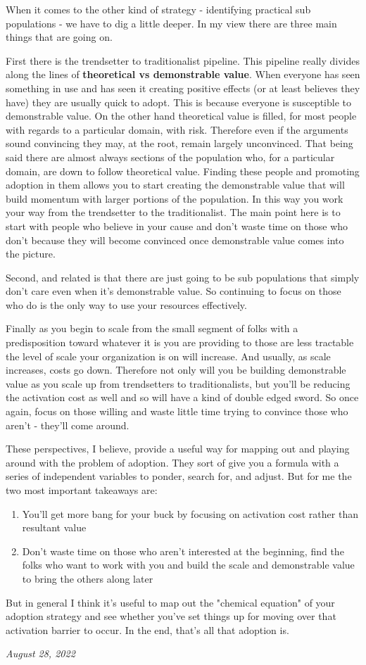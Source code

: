 \documentclass[10pt,a5paper]{book}
\begin{document}
When it comes to the other kind of strategy - identifying practical sub populations - we have to dig a little deeper. In my view there are three main things that are going on. 

First there is the trendsetter to traditionalist pipeline. This pipeline really divides along the lines of \textbf{theoretical vs demonstrable value}. When everyone has seen something in use and has seen it creating positive effects (or at least believes they have) they are usually quick to adopt. This is because everyone is susceptible to demonstrable value. On the other hand theoretical value is filled, for most people with regards to a particular domain, with risk. Therefore even if the arguments sound convincing they may, at the root, remain largely unconvinced. That being said there are almost always sections of the population who, for a particular domain, are down to follow theoretical value. Finding these people and promoting adoption in them allows you to start creating the demonstrable value that will build momentum with larger portions of the population. In this way you work your way from the trendsetter to the traditionalist. The main point here is to start with people who believe in your cause and don't waste time on those who don't because they will become convinced once demonstrable value comes into the picture. 

Second, and related is that there are just going to be sub populations that simply don't care even when it's demonstrable value. So continuing to focus on those who do is the only way to use your resources effectively.

Finally as you begin to scale from the small segment of folks with a predisposition toward whatever it is you are providing to those are less tractable the level of scale your organization is on will increase. And usually, as scale increases, costs go down. Therefore not only will you be building demonstrable value as you scale up from trendsetters to traditionalists, but you'll be reducing the activation cost as well and so will have a kind of double edged sword. So once again, focus on those willing and waste little time trying to convince those who aren't - they'll come around. 

These perspectives, I believe, provide a useful way for mapping out and playing around with the problem of adoption. They sort of give you a formula with a series of independent variables to ponder, search for, and adjust. But for me the two most important takeaways are:
\begin{enumerate}
\item You'll get more bang for your buck by focusing on activation cost rather than resultant value
\item Don't waste time on those who aren't interested at the beginning, find the folks who want to work with you and build the scale and demonstrable value to bring the others along later
\end{enumerate}

But in general I think it's useful to map out the "chemical equation" of your adoption strategy and see whether you've set things up for moving over that activation barrier to occur. In the end, that's all that adoption is. 


\textit{August 28, 2022}
\end{document}
